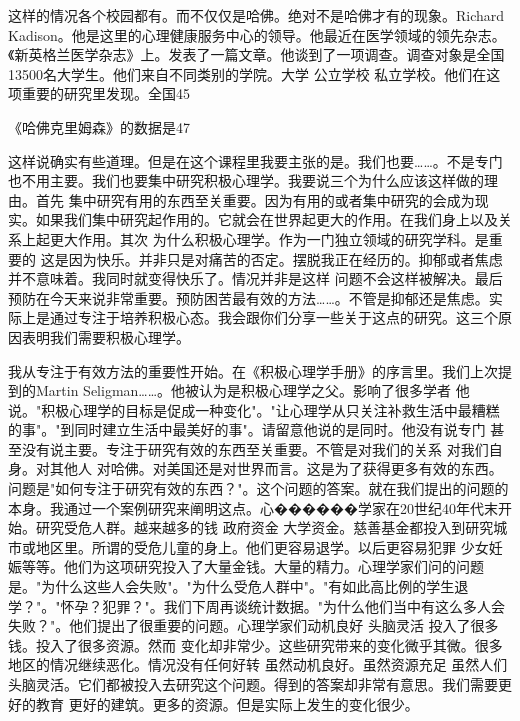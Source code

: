 这样的情况各个校园都有。而不仅仅是哈佛。绝对不是哈佛才有的现象。Richard Kadison。他是这里的心理健康服务中心的领导。他最近在医学领域的领先杂志。《新英格兰医学杂志》上。发表了一篇文章。他谈到了一项调查。调查对象是全国13500名大学生。他们来自不同类别的学院。大学 公立学校 私立学校。他们在这项重要的研究里发现。全国45%

《哈佛克里姆森》的数据是47%

这样说确实有些道理。但是在这个课程里我要主张的是。我们也要……。不是专门 也不用主要。我们也要集中研究积极心理学。我要说三个为什么应该这样做的理由。首先 集中研究有用的东西至关重要。因为有用的或者集中研究的会成为现实。如果我们集中研究起作用的。它就会在世界起更大的作用。在我们身上以及关系上起更大作用。其次 为什么积极心理学。作为一门独立领域的研究学科。是重要的 这是因为快乐。并非只是对痛苦的否定。摆脱我正在经历的。抑郁或者焦虑并不意味着。我同时就变得快乐了。情况并非是这样 问题不会这样被解决。最后 预防在今天来说非常重要。预防困苦最有效的方法……。不管是抑郁还是焦虑。实际上是通过专注于培养积极心态。我会跟你们分享一些关于这点的研究。这三个原因表明我们需要积极心理学。 

我从专注于有效方法的重要性开始。在《积极心理学手册》的序言里。我们上次提到的Martin Seligman……。他被认为是积极心理学之父。影响了很多学者 他说。"积极心理学的目标是促成一种变化"。"让心理学从只关注补救生活中最糟糕的事"。"到同时建立生活中最美好的事"。请留意他说的是同时。他没有说专门 甚至没有说主要。专注于研究有效的东西至关重要。不管是对我们的关系 对我们自身。对其他人 对哈佛。对美国还是对世界而言。这是为了获得更多有效的东西。问题是"如何专注于研究有效的东西？"。这个问题的答案。就在我们提出的问题的本身。我通过一个案例研究来阐明这点。心������学家在20世纪40年代末开始。研究受危人群。越来越多的钱 政府资金 大学资金。慈善基金都投入到研究城市或地区里。所谓的受危儿童的身上。他们更容易退学。以后更容易犯罪 少女妊娠等等。他们为这项研究投入了大量金钱。大量的精力。心理学家们问的问题是。"为什么这些人会失败"。"为什么受危人群中"。"有如此高比例的学生退学？"。"怀孕？犯罪？"。我们下周再谈统计数据。"为什么他们当中有这么多人会失败？"。他们提出了很重要的问题。心理学家们动机良好 头脑灵活 投入了很多钱。投入了很多资源。然而 变化却非常少。这些研究带来的变化微乎其微。很多地区的情况继续恶化。情况没有任何好转 虽然动机良好。虽然资源充足 虽然人们头脑灵活。它们都被投入去研究这个问题。得到的答案却非常有意思。我们需要更好的教育 更好的建筑。更多的资源。但是实际上发生的变化很少。 

